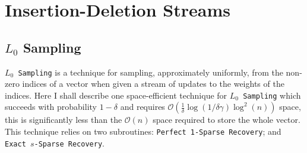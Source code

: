 \documentclass[11pt,twoside,a4paper]{report}
\begin{document}
\chapter{Insertion-Deletion Streams}

\section{$L_0$ Sampling}


\par\texttt{$L_0$ Sampling} is a technique for sampling, approximately uniformly, from the non-zero indices of a vector when given a stream of updates to the weights of the indices. Here I shall describe one space-efficient technique for \texttt{$L_0$ Sampling} which succeeds with probability $1-\delta$ and requires $\mathcal{O}\left(\frac1\delta\log(1/\delta\gamma)\log^2(n)\right)$ space, this is significantly less than the $\mathcal{O}(n)$ space required to store the whole vector. This technique relies on two subroutines: \texttt{Perfect 1-Sparse Recovery}; and \texttt{Exact $s$-Sparse Recovery}. %
\end{document}
